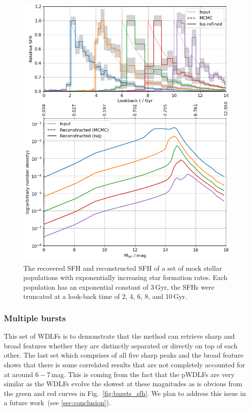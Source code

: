 \documentclass[fleqn,usenatbib]{mnras}
\begin{document}
\begin{figure}
  \includegraphics[width=\columnwidth]{figures/fig_01_exponential_decay_wdlf.png}
  \caption{The recovered SFH and reconstructed SFH of a set of mock stellar
  populations with exponentially increasing star formation rates. Each
  population has an exponential constant of 3\,Gyr, the SFHs were truncated at
  a look-back time of 2, 4, 6, 8, and 10\,Gyr.}
  \label{fig:exponential_sfh}
\end{figure}

\subsubsection*{Multiple bursts}
This set of WDLFs is to demonstrate that the method can retrieve sharp and
broad features whether they are distinctly separated or directly on top of each
other. The last set which comprises of all five sharp peaks and the broad
feature shows that there is some correlated results that are not completely
accounted for at around $6-7$\,mag. This is coming from the fact that the
pWDLFs are very similar as the WDLFs evolve the slowest at these magnitudes as
is obvious from the green and red curves in Fig.~\ref{fig:bursts_sfh}. We plan
to address this issue in a future work~(see \ref{sec:conclusion}).
\end{document}
